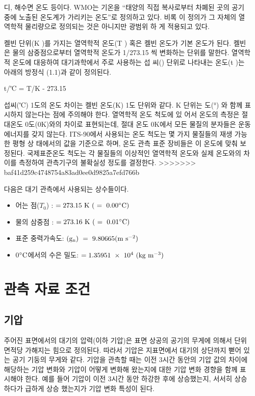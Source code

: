 \begin{itemize}
{디, 해수면 온도 등이다. WMO는 기온을 “태양의 직접 복사로부터 차폐된
곳의 공기 중에 노출된 온도계가 가리키는 온도”로 정의하고 있다. 비록 이
정의가 그 자체의 열역학적 물리량으로 정의되는 것은 아니지만 광범위 하
게 적용되고 있다.

켈빈 단위(K )를 가지는 열역학적 온도(T ) 혹은 켈빈 온도가 기본 온도가
된다. 켈빈은 물의 삼중점으로부터 열역학적 온도가 1/273.15 씩 변화하는
단위를 말한다. 열역학적 온도에 대응하여 대기과학에서 주로 사용하는 섭
씨() 단위로 나타내는 온도(t )는 아래의 방정식 (1.1)과 같이 정의된다.

t/℃ = T/K - 273.15

섭씨(℃) 1도의 온도 차이는 켈빈 온도(K) 1도 단위와 같다. K 단위는 도(°)
와 함께 표시하지 않는다는 점에 주의해야 한다. 열역학적 온도 척도에 있
어서 온도의 측정은 절대온도 0도(0K)와의 차이로 표현되는데, 절대 온도
0K에서 모든 물질의 분자들은 운동 에너지를 갖지 않는다.
ITS-90에서 사용되는 온도 척도는 몇 가지 물질들의 재생 가능한 평형 상
태에서의 값을 기준으로 하며, 온도 관측 표준 장비들은 이 온도에 맞춰 보
정된다. 국제표준온도 척도는 각 물질들의 이상적인 열역학적 온도와 실제
온도와의 차이를 측정하여 관측기구의 불확실성 정도를 결정한다.
>>>>>>> baf41d259c4748754a83ad0ee0d9825a7efd766b

다음은 대기 관측에서 사용되는 상수들이다.

\begin{itemize}
	\item 어는 점($T_0$) : $\rm {= 273.15~K~(~=~0.00 ^{\circ}C)}$
	\item 물의 삼중점 : $\rm {= 273.16~K~(~=~0.01 ^{\circ}C)}$
	\item 표준 중력가속도: $\rm {(g_n)~=~9.80665(m~s^{-2})}$
	\item 0$\rm ^{\circ}C$에서의 수은 밀도: $\rm {= 1.35951~ \times ~10^4~(kg~m^{-3})}$
\end{itemize}

\section{관측 자료 조건}
\subsection{기압}

주어진 표면에서의 대기의 압력(이하 기압)은 표면 상공의 공기의 무게에 의해서 단위 면적당 가해지는 힘으로 정의된다. 따라서 기압은 지표면에서 대기의 상단까지 뻗어 있는 공기 기둥의 무게와 같다. 기압을 관측할 때는 이전 3시간 동안의 기압 값의 차이에 해당하는 기압 변화와 기압이 어떻게 변화해 왔는지에 대한 기압 변화 경향을 함께 표시해야 한다. 예를 들어 기압이 이전 3시간 동안 하강한 후에 상승했는지, 서서히 상승 하다가 급하게 상승 했는지가 기압 변화 특성이 된다.

}
\end{itemize}
